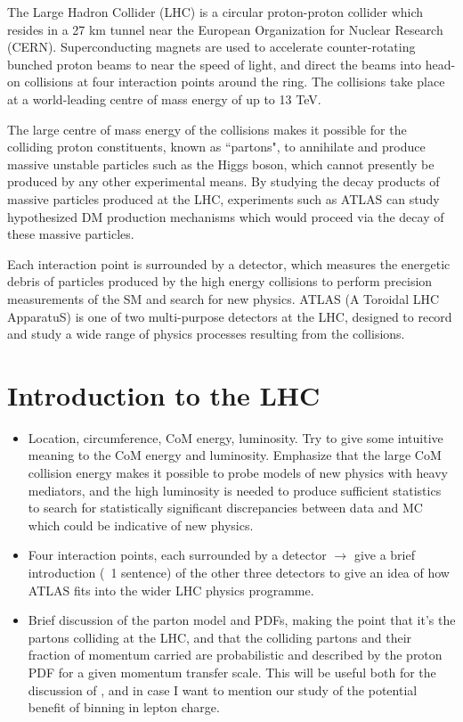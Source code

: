 \label{chapter:lhc_atlas}

The Large Hadron Collider (LHC) \cite{lhc_machine} is a circular proton-proton collider which resides in a 27 km tunnel near the European Organization for Nuclear Research (CERN). Superconducting magnets are used to accelerate counter-rotating bunched proton beams to near the speed of light, and direct the beams into head-on collisions at four interaction points around the ring. The collisions take place at a world-leading centre of mass energy of up to 13 TeV. 

The large centre of mass energy of the collisions makes it possible for the colliding proton constituents, known as ``partons", to annihilate and produce massive unstable particles such as the Higgs boson, which cannot presently be produced by any other experimental means. By studying the decay products of massive particles produced at the LHC, experiments such as ATLAS can study hypothesized DM production mechanisms which would proceed via the decay of these massive particles. 

Each interaction point is surrounded by a detector, which measures the energetic debris of particles produced by the high energy collisions to perform precision measurements of the SM and search for new physics. ATLAS (A Toroidal LHC ApparatuS) \cite{atlas} is one of two multi-purpose detectors at the LHC, designed to record and study a wide range of physics processes resulting from the collisions. 

\section{Introduction to the LHC}
\begin{itemize}
\item Location, circumference, CoM energy, luminosity. Try to give some intuitive meaning to the CoM energy and luminosity. Emphasize that the large CoM collision energy makes it possible to probe models of new physics with heavy mediators, and the high luminosity is needed to produce sufficient statistics to search for statistically significant discrepancies between data and MC which could be indicative of new physics. 
\item Four interaction points, each surrounded by a detector $\rightarrow$ give a brief introduction (~1 sentence) of the other three detectors to give an idea of how ATLAS fits into the wider LHC physics programme.
\item Brief discussion of the parton model and PDFs, making the point that it's the partons colliding at the LHC, and that the colliding partons and their fraction of momentum carried are probabilistic and described by the proton PDF for a given momentum transfer scale. This will be useful both for the discussion of \met, and in case I want to mention our study of the potential benefit of binning in lepton charge.
\end{itemize}

